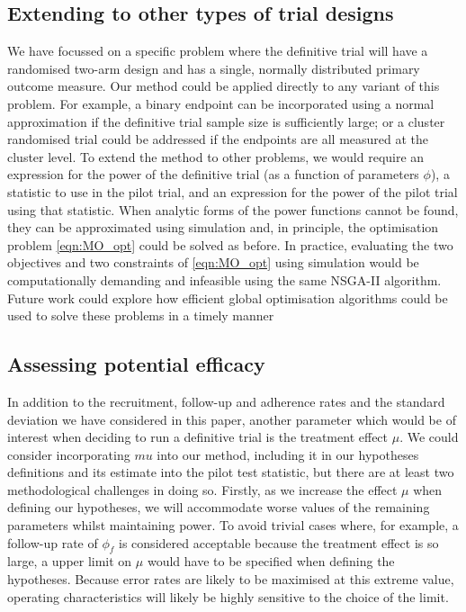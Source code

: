 \documentclass[AMA,STIX1COL]{WileyNJD-v2}
\begin{document}
\subsection{Extending to other types of trial designs}

We have focussed on a specific problem where the definitive trial will have a randomised two-arm design and has a single, normally distributed primary outcome measure. Our method could be applied directly to any variant of this problem. For example, a binary endpoint can be incorporated using a normal approximation if the definitive trial sample size is sufficiently large; or a cluster randomised trial could be addressed if the endpoints are all measured at the cluster level. To extend the method to other problems, we would require an expression for the power of the definitive trial (as a function of parameters $\phi$), a statistic to use in the pilot trial, and an expression for the power of the pilot trial using that statistic. When analytic forms of the power functions cannot be found, they can be approximated using simulation \cite{Landau2013} and, in principle, the optimisation problem \ref{eqn:MO_opt} could be solved as before. In practice, evaluating the two objectives and two constraints of \ref{eqn:MO_opt} using simulation would be computationally demanding and infeasible using the same NSGA-II algorithm. Future work could explore how efficient global optimisation algorithms \cite{Jones2001} could be used to solve these problems in a timely manner 

\subsection{Assessing potential efficacy}

In addition to the recruitment, follow-up and adherence rates and the standard deviation we have considered in this paper, another parameter which would be of interest when deciding to run a definitive trial is the treatment effect $\mu$. We could consider incorporating $mu$ into our method, including it in our hypotheses definitions and its estimate into the pilot test statistic, but there are at least two methodological challenges in doing so. Firstly, as we increase the effect $\mu$ when defining our hypotheses, we will accommodate worse values of the remaining parameters whilst maintaining power. To avoid trivial cases where, for example, a follow-up rate of $\phi_f$ is considered acceptable because the treatment effect is so large, a upper limit on $\mu$ would have to be specified when defining the hypotheses. Because error rates are likely to be maximised at this extreme value, operating characteristics will likely be highly sensitive to the choice of the limit.
\end{document}
